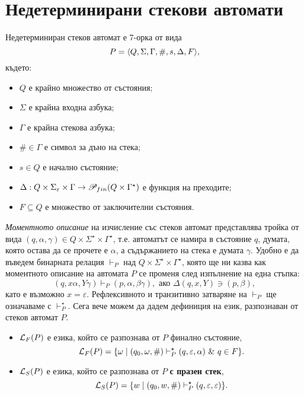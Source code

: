 \section{Недетерминирани стекови автомати}

\begin{dfn}
  Недетерминиран стеков автомат е 7-орка от вида
  \[P = \langle{Q,\Sigma,\Gamma,\#,s,\Delta,F}\rangle,\] където:
  \begin{itemize}
  \item
    $Q$ е крайно множество от състояния;
  \item  
    $\Sigma$ е крайна входна азбука;
  \item
    $\Gamma$ е крайна стекова азбука;
  \item
    $\# \in \Gamma$ е символ за дъно на стека;
  \item
    $s\in Q$ е начално състояние;
  \item
    $\Delta:Q\times\Sigma_\varepsilon\times\Gamma\rightarrow \mathscr{P}_{fin}(Q\times\Gamma^\star)$ 
    е функция на преходите;    
  \item
    $F\subseteq Q$ е множество от заключителни състояния.
  \end{itemize}
\end{dfn}

{\em Моментното описание} на изчисление със стеков автомат представлява тройка от вида $(q,\alpha,\gamma) \in Q\times\Sigma^\star\times\Gamma^\star$,
т.е. автоматът се намира в състояние $q$, думата, която остава да се прочете е $\alpha$,
а съдържанието на стека е думата $\gamma$.
Удобно е да въведем бинарната релация $\vdash_P$ над $Q\times\Sigma^\star\times\Gamma^\star$,
която ще ни казва как моментното описание на автомата $P$ се променя след изпълнение на една стъпка:
\[(q,x\alpha,Y\gamma) \vdash_P (p,\alpha,\beta\gamma), \text{ ако } \Delta(q,x,Y) \ni (p,\beta),\]
като е възможно $x = \varepsilon$.
Рефлексивното и транзитивно затваряне на $\vdash_P$ ще означаваме с $\vdash^\star_P$.
Сега вече можем да дадем дефиниция на език, разпознаван от стеков автомат $P$.
\begin{itemize}
\item
  $\mathcal{L}_F(P)$ е езика, който се разпознава от $P$ { финално състояние},
  \[\L_F(P) = \{\omega \mid (q_0,\omega,\#) \vdash^\star_P (q,\varepsilon,\alpha)\ \&\ q \in F\}.\]    
\item
  $\mathcal{L}_S(P)$ е езика, който се разпознава от $P$  {\bf с празен стек},
  \[\mathcal{L}_S(P) = \{w\mid (q_0,w,\#) \vdash^\star_P (q,\varepsilon,\varepsilon)\}.\]    
\end{itemize}

